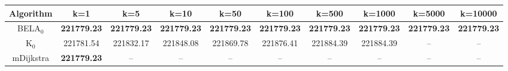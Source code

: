 \begin{tabular}{c|ccccccccc}\toprule
Algorithm & k=1 & k=5 & k=10 & k=50 & k=100 & k=500 & k=1000 & k=5000 & k=10000 \\ \midrule
BELA$_0$ & \textbf{221779.23} & \textbf{221779.23} & \textbf{221779.23} & \textbf{221779.23} & \textbf{221779.23} & \textbf{221779.23} & \textbf{221779.23} & \textbf{221779.23} & \textbf{221779.23} \\
K$_0$ & 221781.54 & 221832.17 & 221848.08 & 221869.78 & 221876.41 & 221884.39 & 221884.39 & -- & -- \\
mDijkstra & \textbf{221779.23} & -- & -- & -- & -- & -- & -- & -- & -- \\ \bottomrule 
\end{tabular}

